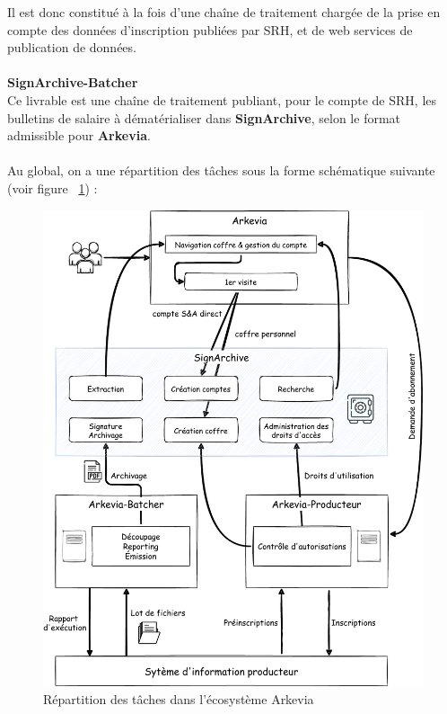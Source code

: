 Il est donc constitué à la fois d’une chaîne de traitement chargée de la prise en compte des données d’inscription publiées par SRH, et de web services de publication de données.\\\\
\textbf{SignArchive-Batcher}\\
Ce livrable est une chaîne de traitement publiant, pour le compte de SRH, les bulletins de salaire à dématérialiser dans \textbf{SignArchive}, selon le format admissible pour \textbf{Arkevia}.\\\\
Au global, on a une répartition des tâches sous la forme schématique suivante (voir figure  ~\ref{fig:architecture_arkevia}) :
\begin{figure}[H]
    \begin{center}
        \includegraphics[width=\linewidth]{images/sec2/architecture-globale.pdf}
        \caption{Répartition des tâches dans l'écosystème Arkevia}
        \label{fig:architecture_arkevia}
    \end{center}
\end{figure}
\newpage

